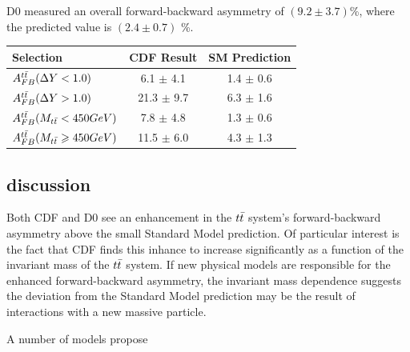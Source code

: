 D0 measured an overall forward-backward asymmetry of $(9.2 \pm 3.7)$\%, where the predicted value is $(2.4 \pm 0.7)$ \%.

\begin{tabular}{lcc}
\hline
Selection                         &   CDF Result    & SM Prediction \\
\hline
$A^{t\bar{t}}_{FB}( \Delta Y < 1.0)$ &   6.1 $\pm$ 4.1 & 1.4 $\pm$ 0.6 \\
$A^{t\bar{t}}_{FB}( \Delta Y > 1.0)$ &  21.3 $\pm$ 9.7 & 6.3 $\pm$ 1.6 \\
\hline
$A^{t\bar{t}}_{FB}( M_{t\bar{t}} < 450 GeV)$ & 7.8 $\pm$ 4.8 & 1.3 $\pm$ 0.6 \\   
$A^{t\bar{t}}_{FB}( M_{t\bar{t}} \geqslant 450 GeV)$ & 11.5 $\pm$ 6.0 & 4.3 $\pm$ 1.3 \\
\hline
\end{tabular}

\subsection{discussion}
Both CDF and D0 see an enhancement in the $t\bar{t}$ system's forward-backward asymmetry above the small Standard Model prediction.
Of particular interest is the fact that CDF finds this inhance to increase significantly as a function of the invariant mass of the $t\bar{t}$ system.
If new physical models are responsible for the enhanced forward-backward asymmetry, the invariant mass dependence suggests the deviation from the Standard Model prediction may be the result of interactions with a new massive particle. %

A number of models propose %


